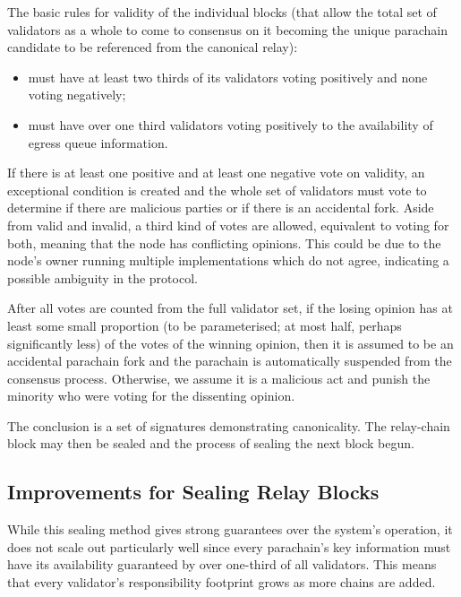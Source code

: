 \documentclass[9pt,oneside]{amsart}
\begin{document}
\begin{multicols}{2}
 The basic rules for validity of the individual blocks (that allow the total set of validators as a whole to come to consensus on it becoming the unique parachain candidate to be referenced from the canonical relay):

\begin{itemize}
\item must have at least two thirds of its validators voting positively and none voting negatively;
\item must have over one third validators voting positively to the availability of egress queue information.
\end{itemize}

 If there is at least one positive and at least one negative vote on validity, an exceptional condition is created and the whole set of validators must vote to determine if there are malicious parties or if there is an accidental fork. Aside from valid and invalid, a third kind of votes are allowed, equivalent to voting for both, meaning that the node has conflicting opinions. This could be due to the node's owner running multiple implementations which do not agree, indicating a possible ambiguity in the protocol.

 After all votes are counted from the full validator set, if the losing opinion has at least some small proportion (to be parameterised; at most half, perhaps significantly less) of the votes of the winning opinion, then it is assumed to be an accidental parachain fork and the parachain is automatically suspended from the consensus process. Otherwise, we assume it is a malicious act and punish the minority who were voting for the dissenting opinion.

 The conclusion is a set of signatures demonstrating canonicality. The relay-chain block may then be sealed and the process of sealing the next block begun.

\subsection{Improvements for Sealing Relay Blocks}
\label{improvements-for-sealing-relay-blocks}

 While this sealing method gives strong guarantees over the system's operation, it does not scale out particularly well since every parachain's key information must have its availability guaranteed by over one-third of all validators. This means that every validator's responsibility footprint grows as more chains are added.


\end{multicols}
\end{document}
